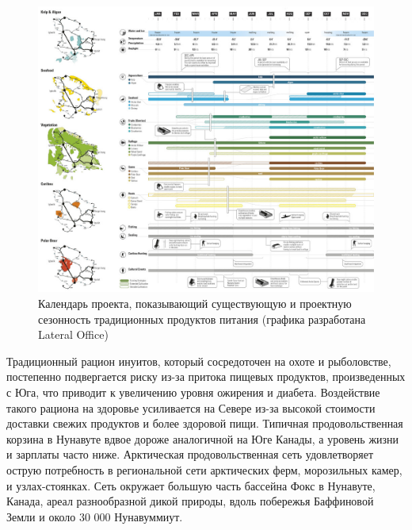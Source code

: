 \begin{figure}
    \centering
    \includegraphics[width=\textwidth]{assets/figures/ch01_s10_sci_AFN01_calendar.png}
    \caption{Календарь проекта, показывающий существующую и проектную сезонность традиционных продуктов питания (графика разработана Lateral Office)}
    \label{fig:ch01_s10_sci_AFN01_calendar}
  \end{figure}

Традиционный рацион инуитов, который сосредоточен на охоте и рыболовстве, постепенно подвергается риску из-за притока пищевых продуктов, произведенных с Юга,
что приводит к увеличению уровня ожирения и диабета. Воздействие такого рациона на здоровье усиливается на Севере из-за высокой стоимости доставки свежих продуктов и более здоровой пищи.
Типичная продовольственная корзина в Нунавуте вдвое дороже аналогичной на Юге Канады, а уровень жизни и зарплаты часто ниже.
Арктическая продовольственная сеть удовлетворяет острую потребность в региональной сети арктических ферм, морозильных камер, и узлах-стоянках.
Сеть окружает большую часть бассейна Фокс в Нунавуте, Канада, ареал разнообразной дикой природы, вдоль побережья Баффиновой Земли и около 30 000 Нунавуммиут.

